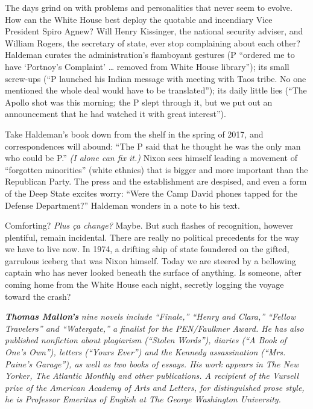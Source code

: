 The days grind on with problems and personalities that never seem to
evolve. How can the White House best deploy the quotable and incendiary
Vice President Spiro Agnew? Will Henry Kissinger, the national security
adviser, and William Rogers, the secretary of state, ever stop
complaining about each other? Haldeman curates the administration's
flamboyant gestures (P ``ordered me to have `Portnoy's Complaint'
\ldots{} removed from White House library''); its small screw-ups (``P
launched his Indian message with meeting with Taos tribe. No one
mentioned the whole deal would have to be translated''); its daily
little lies (``The Apollo shot was this morning; the P slept through it,
but we put out an announcement that he had watched it with great
interest'').

Take Haldeman's book down from the shelf in the spring of 2017, and
correspondences will abound: ``The P said that he thought he was the
only man who could be P.'' \emph{(I alone can fix it.)} Nixon sees
himself leading a movement of ``forgotten minorities'' (white ethnics)
that is bigger and more important than the Republican Party. The press
and the establishment are despised, and even a form of the Deep State
excites worry: ``Were the Camp David phones tapped for the Defense
Department?'' Haldeman wonders in a note to his text.

Comforting? \emph{Plus ça change?} Maybe. But such flashes of
recognition, however plentiful, remain incidental. There are really no
political precedents for the way we have to live now. In 1974, a
drifting ship of state foundered on the gifted, garrulous iceberg that
was Nixon himself. Today we are steered by a bellowing captain who has
never looked beneath the surface of anything. Is someone, after coming
home from the White House each night, secretly logging the voyage toward
the crash?

\emph{\textbf{Thomas Mallon's}} \emph{nine novels include ``Finale,''
``Henry and Clara,'' ``Fellow Travelers'' and ``Watergate,'' a finalist
for the PEN/Faulkner Award. He has also published nonfiction about
plagiarism (``Stolen Words''), diaries (``A Book of One's Own''),
letters (``Yours Ever'') and the Kennedy assassination (``Mrs. Paine's
Garage''), as well as two books of essays. His work appears in The New
Yorker, The Atlantic Monthly and other publications. A recipient of the
Vursell prize of the American Academy of Arts and Letters, for
distinguished prose style, he is Professor Emeritus of English at The
George Washington University.}

